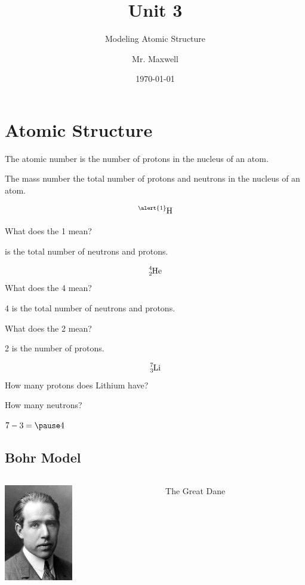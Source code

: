 \documentclass{beamer}
\title{Unit 3}
\subtitle{Modeling Atomic Structure}
\author{Mr. Maxwell}
\institute{PACS}
\date{\today}
\begin{document}
\frame{\titlepage}

\section{Atomic Structure}

\begin{frame}

\onslide The 
 \pause \alert{atomic number}
 \onslide is the number of 
 \pause \alert{protons} 
 \onslide in the nucleus of an atom.
\end{frame}


\begin{frame}
    \onslide The 
     \pause \alert{mass number}
     \onslide the total number of
     \pause \alert{protons} 
     \onslide and
     \pause \alert{neutrons} 
     \onslide in the nucleus of an atom.
    \end{frame}

\begin{frame}
    $$\ce{^{\alert{1}}_{}H}$$

    \pause What does the \alert{1} mean?

     is the total number of neutrons and protons.
\end{frame}


\begin{frame}
 $$\ce{^{4}_{2}He}$$
    \pause What does the \alert{4} mean?

    \pause \alert{4} is the total number of neutrons and protons.

    \pause What does the \alert{2} mean?

    \pause \alert{2} is the number of protons.
\end{frame}

\begin{frame}
 $$\ce{^{7}_{3}Li}$$
    \pause How many protons does Lithium have?


    \pause How many neutrons?

    \pause $7 - 3 = \pause 4 $

\end{frame}

\subsection{Bohr Model}

\begin{frame}
    \begin{columns}
        \begin{column}{0.5\textwidth}
            \includegraphics[width=3cm]{../../images/Bohr.jpg}
        \end{column}
        \begin{column}{0.5\textwidth}
            The Great Dane
        \end{column}
    \end{columns}
\end{frame}
\end{document}

